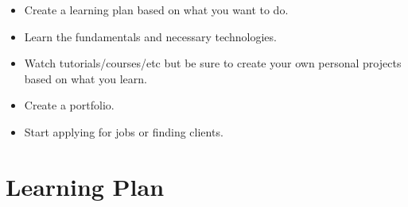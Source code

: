 \begin{itemize}
    \item Create a learning plan based on what you want to do.
    \item Learn the fundamentals and necessary technologies.
    \item Watch tutorials/courses/etc but be sure to create your own personal projects based on what you learn.
    \item Create a portfolio.
    \item Start applying for jobs or finding clients.
\end{itemize}

\section{Learning Plan}

